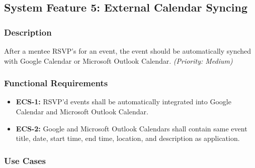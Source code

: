 \subsection{System Feature 5: External Calendar Syncing} 


\subsubsection{Description}

After a mentee RSVP's for an event, the event should be automatically synched
with Google Calendar or Microsoft Outlook Calendar.
\textit{(Priority: Medium)}



\subsubsection{Functional Requirements}

\begin{itemize}[label=$\bullet$]
    \item \textbf{ECS-1:} RSVP'd events shall be automatically integrated into
    Google Calendar and Microsoft Outlook Calendar.

    \item \textbf{ECS-2:} Google and Microsoft Outlook Calendars shall contain
    same event title, date, start time, end time, location, and description as
    application.
\end{itemize}



\subsubsection{Use Cases}

